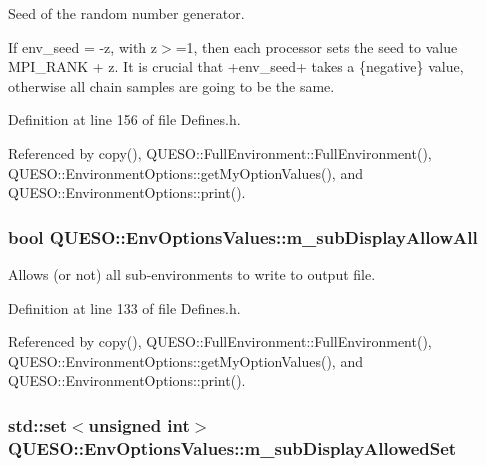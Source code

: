 Seed of the random number generator. 

If env\-\_\-seed = -\/z, with z$>$=1, then each processor sets the seed to value M\-P\-I\-\_\-\-R\-A\-N\-K + z. It is crucial that +env\-\_\-seed+ takes a \{negative\} value, otherwise all chain samples are going to be the same. 

Definition at line 156 of file Defines.\-h.



Referenced by copy(), Q\-U\-E\-S\-O\-::\-Full\-Environment\-::\-Full\-Environment(), Q\-U\-E\-S\-O\-::\-Environment\-Options\-::get\-My\-Option\-Values(), and Q\-U\-E\-S\-O\-::\-Environment\-Options\-::print().

\hypertarget{class_q_u_e_s_o_1_1_env_options_values_a942d62cb804c174e1de76cc776368924}{
\subsubsection[{m\-\_\-sub\-Display\-Allow\-All}]{\setlength{\rightskip}{0pt plus 5cm}bool Q\-U\-E\-S\-O\-::\-Env\-Options\-Values\-::m\-\_\-sub\-Display\-Allow\-All}}\label{class_q_u_e_s_o_1_1_env_options_values_a942d62cb804c174e1de76cc776368924}


Allows (or not) all sub-\/environments to write to output file. 



Definition at line 133 of file Defines.\-h.



Referenced by copy(), Q\-U\-E\-S\-O\-::\-Full\-Environment\-::\-Full\-Environment(), Q\-U\-E\-S\-O\-::\-Environment\-Options\-::get\-My\-Option\-Values(), and Q\-U\-E\-S\-O\-::\-Environment\-Options\-::print().

\hypertarget{class_q_u_e_s_o_1_1_env_options_values_afd2f167d8f568df84b3efe5df4430ee3}{
\subsubsection[{m\-\_\-sub\-Display\-Allowed\-Set}]{\setlength{\rightskip}{0pt plus 5cm}std\-::set$<$unsigned int$>$ Q\-U\-E\-S\-O\-::\-Env\-Options\-Values\-::m\-\_\-sub\-Display\-Allowed\-Set}}\label{class_q_u_e_s_o_1_1_env_options_values_afd2f167d8f568df84b3efe5df4430ee3}


